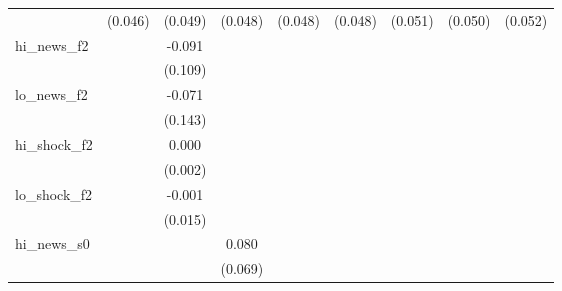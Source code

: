 {\begin{tabular}{l*{8}{c}}
            &     (0.046)         &     (0.049)         &     (0.048)         &     (0.048)         &     (0.048)         &     (0.051)         &     (0.050)         &     (0.052)         \\
\addlinespace
hi\_news\_f2  &                     &      -0.091         &                     &                     &                     &                     &                     &                     \\
            &                     &     (0.109)         &                     &                     &                     &                     &                     &                     \\
\addlinespace
lo\_news\_f2  &                     &      -0.071         &                     &                     &                     &                     &                     &                     \\
            &                     &     (0.143)         &                     &                     &                     &                     &                     &                     \\
\addlinespace
hi\_shock\_f2 &                     &       0.000         &                     &                     &                     &                     &                     &                     \\
            &                     &     (0.002)         &                     &                     &                     &                     &                     &                     \\
\addlinespace
lo\_shock\_f2 &                     &      -0.001         &                     &                     &                     &                     &                     &                     \\
            &                     &     (0.015)         &                     &                     &                     &                     &                     &                     \\
\addlinespace
hi\_news\_s0  &                     &                     &       0.080         &                     &                     &                     &                     &                     \\
            &                     &                     &     (0.069)         &                     &                     &                     &                     &                     \\

\end{tabular}}
